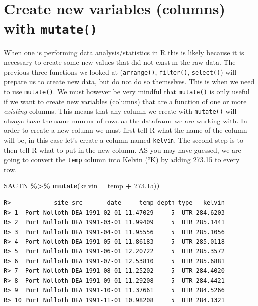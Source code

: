 \documentclass[
]{book}
\newenvironment{Shaded}{\begin{snugshade}}{\end{snugshade}}
\newcommand{\DataTypeTok}[1]{\textcolor[rgb]{0.13,0.29,0.53}{#1}}
\newcommand{\ErrorTok}[1]{\textcolor[rgb]{0.64,0.00,0.00}{\textbf{#1}}}
\newcommand{\FloatTok}[1]{\textcolor[rgb]{0.00,0.00,0.81}{#1}}
\newcommand{\KeywordTok}[1]{\textcolor[rgb]{0.13,0.29,0.53}{\textbf{#1}}}
\newcommand{\NormalTok}[1]{#1}
\newcommand{\OperatorTok}[1]{\textcolor[rgb]{0.81,0.36,0.00}{\textbf{#1}}}
\newcommand{\StringTok}[1]{\textcolor[rgb]{0.31,0.60,0.02}{#1}}
\begin{document}
\hypertarget{create-new-variables-columns-with-mutate}{%
\section{\texorpdfstring{Create new variables (columns) with \texttt{mutate()}}{Create new variables (columns) with mutate()}}\label{create-new-variables-columns-with-mutate}}

When one is performing data analysis/statistics in R this is likely because it is necessary to create some new values that did not exist in the raw data. The previous three functions we looked at (\texttt{arrange()}, \texttt{filter()}, \texttt{select()}) will prepare us to create new data, but do not do so themselves. This is when we need to use \texttt{mutate()}. We must however be very mindful that \texttt{mutate()} is only useful if we want to create new variables (columns) that are a function of one or more \emph{existing} columns. This means that any column we create with \texttt{mutate()} will always have the same number of rows as the dataframe we are working with. In order to create a new column we must first tell R what the name of the column will be, in this case let's create a column named \texttt{kelvin}. The second step is to then tell R what to put in the new column. AS you may have guessed, we are going to convert the \texttt{temp} column into Kelvin (°K) by adding 273.15 to every row.

\begin{Shaded}
\begin{Highlighting}[]
\NormalTok{SACTN }\OperatorTok{\%>\%}\StringTok{ }
\StringTok{  }\KeywordTok{mutate}\NormalTok{(}\DataTypeTok{kelvin =}\NormalTok{ temp }\OperatorTok{+}\StringTok{ }\FloatTok{273.15}\NormalTok{)}\ErrorTok{)}
\end{Highlighting}
\end{Shaded}

\begin{verbatim}
R>            site src       date     temp depth type   kelvin
R> 1  Port Nolloth DEA 1991-02-01 11.47029     5  UTR 284.6203
R> 2  Port Nolloth DEA 1991-03-01 11.99409     5  UTR 285.1441
R> 3  Port Nolloth DEA 1991-04-01 11.95556     5  UTR 285.1056
R> 4  Port Nolloth DEA 1991-05-01 11.86183     5  UTR 285.0118
R> 5  Port Nolloth DEA 1991-06-01 12.20722     5  UTR 285.3572
R> 6  Port Nolloth DEA 1991-07-01 12.53810     5  UTR 285.6881
R> 7  Port Nolloth DEA 1991-08-01 11.25202     5  UTR 284.4020
R> 8  Port Nolloth DEA 1991-09-01 11.29208     5  UTR 284.4421
R> 9  Port Nolloth DEA 1991-10-01 11.37661     5  UTR 284.5266
R> 10 Port Nolloth DEA 1991-11-01 10.98208     5  UTR 284.1321
\end{verbatim}
\end{document}
